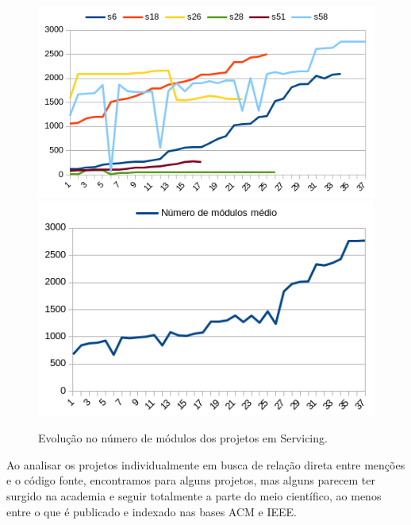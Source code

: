 \begin{figure}[h]
  \center
  \includegraphics[scale=0.6]{imagens/modules-evolution-servicing.png}
  \includegraphics[scale=0.6]{imagens/modules-evolution-average.png}
  \caption{Evolução no número de módulos dos projetos em Servicing.}
  \label{modules-evolution-servicing}
\end{figure}

Ao analisar os projetos individualmente em busca de relação direta entre
menções e o código fonte, encontramos para alguns projetos, mas alguns parecem
ter surgido na academia e seguir totalmente a parte do meio científico, ao
menos entre o que é publicado e indexado nas bases ACM e IEEE.

